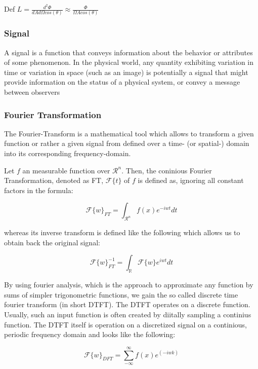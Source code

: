 Def $L = \frac{d^2 \Phi}{dA d\Omega cos(\theta)} \approx \frac{\Phi}{\Omega A cos(\theta)}$

\subsubsection{Signal}
A signal is a function that conveys information about the behavior or attributes of some phenomenon.
In the physical world, any quantity exhibiting variation in time or variation in space (such as an image) is potentially a signal that might provide information on the status of a physical system, or convey a message between observers

\subsubsection{Fourier Transformation}
The Fourier-Transform is a mathematical tool which allows to transform a given function or rather a given signal from defined over a time- (or spatial-) domain into its corresponding frequency-domain.
 
Let $f$ an measurable function over $\mathcal{R}^n$. Then, the coninious Fourier Transformation, denoted as FT, $\mathcal{F}\{t\}$ of $f$ is defined as, ignoring all constant factors in the formula:
 
\begin{equation}
  \mathcal{F}\{w\}_{FT} = \int_{\mathcal{R}^n} f(x)e^{-iwt} dt
\end{equation}

whereas its inverse transform is defined like the following which allows us to obtain back the original signal:

\begin{equation}
  \mathcal{F}\{w\}^{-1}_{FT} = \int_{\mathds{R}} \mathcal{F}\{w\}e^{iwt} dt
\end{equation}

By using fourier analysis, which is the approach to approximate any function by sums of simpler trigonometric functions, we gain the so called discrete time fourier transform (in short DTFT). The DTFT operates on a discrete function. Usually, such an input function is often created by diitally sampling a continius function. The DTFT itself is operation on a discretized signal on a continious, periodic frequency domain and looks like the following:

\begin{equation}
  \mathcal{F}\{w\}_{DFT} = \sum_{-\infty}^{\infty} f(x) e^(-iwk)
\end{equation}

